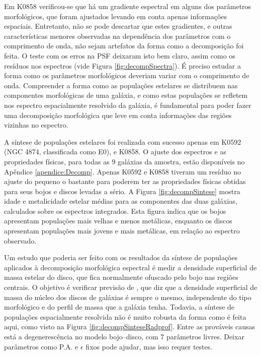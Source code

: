Em K0858 verificou-se que há um gradiente espectral em alguns dos parâmetros
morfológicos, que foram ajustados levando em conta apenas informações espaciais.
Entretanto, não se pode descartar que estes gradientes, e outras características
menores observadas na dependência dos parâmetros com o comprimento de onda, não
sejam artefatos da forma como a decomposição foi feita. O teste com os erros na
PSF deixaram isto bem claro, assim como os resíduos nos espectros (vide Figura
\ref{fig:decompSpectra}). É preciso estudar a forma como os parâmetros
morfológicos deveriam variar com o comprimento de onda. Compreender a forma como
as populações estelares se distribuem nas componentes morfológicas de uma
galáxia, e como estas populações se refletem nos espectro espacialmente
resolvido da galáxia, é fundamental para poder fazer uma decomposição
morfológica que leve em conta informações das regiões vizinhas no espectro.

A síntese de populações estelares foi realizada com sucesso apenas em K0592 (NGC
4874, classificada como E0), e K0858. O ajuste dos espectros e as propriedades
físicas, para todas as 9 galáxias da amostra, estão disponíveis no Apêndice
\ref{apendice:Decomp}. Apenas K0592 e K0858 tiveram um resíduo no ajuste do
\starlight pequeno o bastante para poderem ter as propriedades físicas obtidas
para seus bojos e discos levadas a sério. A Figura \ref{fig:decompSintese}
mostra idade e metalicidade estelar médias para as componentes das duas
galáxias, calculados sobre os espectros integrados. Esta figura indica que os
bojos apresentam populações mais velhas e menos metálicas, enquanto os discos
apresentam populações mais jovens e mais metálicas, em relação ao espectro
observado.

Um estudo que poderia ser feito com os resultados da síntese de populações
aplicados à decomposição morfológica espectral é medir a densidade superficial
de massa estelar do disco, que fica normalmente ofuscado pelo bojo nas regiões
centrais. O objetivo é verificar previsão de \citet{Freeman1970}, que diz que a
densidade superficial de massa do núcleo dos discos de galáxias é sempre o
mesmo, independente do tipo morfológico e do perfil de massa que a galáxia
tenha. Todavia, a síntese de populações espacialmente resolvida não é muito
robusta da forma como é feita aqui, como visto na Figura
\ref{fig:decompSinteseRadprof}. Entre as prováveis causas está a degenerescência
no modelo bojo--disco, com 7 parâmetros livres. Deixar parâmetros como P.A. e
$\epsilon$ fixos pode ajudar, mas isso requer testes.

